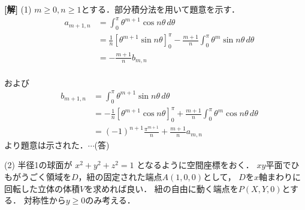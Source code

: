 \documentclass[a4paper,10pt]{ltjsarticle}
\begin{document}
\setlength{\columnseprule}{0.4pt}
\begin{multicols}{2}
  {\bf[解]}
  (1)
  $m \ge 0, n \ge 1$とする．部分積分法を用いて題意を示す．
  \begin{align*}
    \quad a_{m+1,n}
     & = \int_0^\pi \theta^{m+1} \cos n\theta \, d\theta                                                                        \\
     & = \frac{1}{n} \left[ \theta^{m+1} \sin n\theta \right]_0^\pi - \frac{m+1}{n} \int_0^\pi \theta^m \sin n\theta \, d\theta \\
     & = -\frac{m+1}{n} b_{m,n}
  \end{align*}                                                                                                                                                \\
  および
  \begin{align*}
    \quad b_{m+1,n}
     & = \int_0^\pi \theta^{m+1} \sin n\theta \, d\theta                                                                         \\
     & = -\frac{1}{n} \left[ \theta^{m+1} \cos n\theta \right]_0^\pi + \frac{m+1}{n} \int_0^\pi \theta^m \cos n\theta \, d\theta \\
     & = (-1)^{n+1} \frac{\pi^{m+1}}{n} + \frac{m+1}{n} a_{m,n}
  \end{align*}
  より題意は示された．$\cdots$(答)

  \vspace{10pt}
  (2)
  半径1の球面が $x^2+y^2+z^2=1$ となるように空間座標をおく．
  $xy$平面でひもがうごく領域を$D$，紐の固定された端点$A(1,0,0)$として，
  $D$を$x$軸まわりに回転した立体の体積$V$を求めれば良い．
  紐の自由に動く端点を$P(X,Y,0)$とする．
  対称性から$y \geq 0$のみ考える．

  \begin{figure}[H]
    \centering
\end{figure}
\end{multicols}
\end{document}
